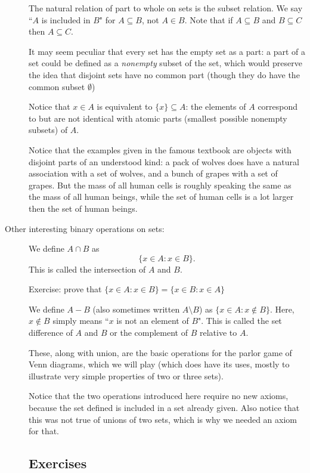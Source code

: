 \documentclass[12pt]{article}
\begin{document}
\begin{description}
The natural relation of part to whole on sets is the subset relation.  We say ``$A$ is included in $B$" for $A \subseteq B$, not $A \in B$.  Note that if $A \subseteq B$ and $B \subseteq C$ then $A \subseteq C$.

It may seem peculiar that every set has the empty set as a part:  a part of a set could be defined as a {\em nonempty\/} subset of the set, which would preserve the idea that disjoint sets have no common part (though they do have the common subset $\emptyset$)

Notice that $x \in A$ is equivalent to $\{x\} \subseteq A$:  the elements of $A$ correspond to but are not identical with atomic parts (smallest possible nonempty subsets) of $A$.

Notice that the examples given in the famous textbook are objects with disjoint parts of an understood kind:  a pack of wolves does have a natural association with a set of wolves, and a bunch of grapes with a set of grapes.   But the mass of all human cells is roughly speaking the same as the mass of all human beings, while the set of human cells is a lot larger then the set of human beings.




\item[Other interesting binary operations on sets:]

We define $A \cap B$ as $$\{x \in A:x \in B\}.$$  This is called the intersection of $A$ and $B$.

Exercise:  prove that $\{x \in A:x \in B\} = \{x \in B:x \in A\}$

We define $A - B$ (also sometimes written $A \setminus B$) as $\{x \in A:x \not\in B\}$.  Here, $x \not\in B$ simply means ``$x$ is not an element of $B$".
This is called the set difference of $A$ and $B$ or the complement of $B$ relative to $A$.

These, along with union, are the basic operations for the parlor game of Venn diagrams, which we will play (which does have its uses, mostly to illustrate very simple properties of two or three sets).

Notice that the two operations introduced here require no new axioms, because the set defined is included in a set already given.  Also notice that this was not true of unions of two sets, which is why we needed an axiom for that.

\newpage

\subsection{Exercises}


\end{description}
\end{document}
